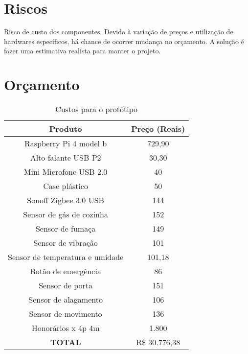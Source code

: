 \documentclass{acm_proc_article-sp}
\begin{document}
\section{Riscos}


Risco de custo dos componentes. Devido à variação de preços e utilização de hardwares específicos, há chance de ocorrer mudança no orçamento. A solução é fazer uma estimativa realista para manter o projeto.



\section{Orçamento}

\begin{table}[!h]
\ABNTEXfontereduzida
\centering
\caption{Custos para o protótipo}
\begin{tabular}{cc}
\hline
\textbf{Produto}                & \textbf{Preço (Reais)} \\ \hline
Raspberry Pi 4 model b          & 729,90                 \\
Alto falante USB P2             & 30,30                  \\
Mini Microfone USB 2.0          & 40                     \\
Case plástico                   & 50                     \\
Sonoff Zigbee 3.0 USB           & 144                    \\
Sensor de gás de cozinha        & 152                    \\
Sensor de fumaça                & 149                    \\
Sensor de vibração              & 101                    \\
Sensor de temperatura e umidade & 101,18                 \\
Botão de emergência             & 86                     \\
Sensor de porta                 & 151                    \\
Sensor de alagamento            & 106                    \\
Sensor de movimento             & 136                    \\
Honorários x 4p 4m              & 1.800                   \\ \hline
\textbf{TOTAL}                  & R\$ 30.776,38           \\ \hline
\end{tabular}
\fonteproprioautor

\end{table}
\end{document}
